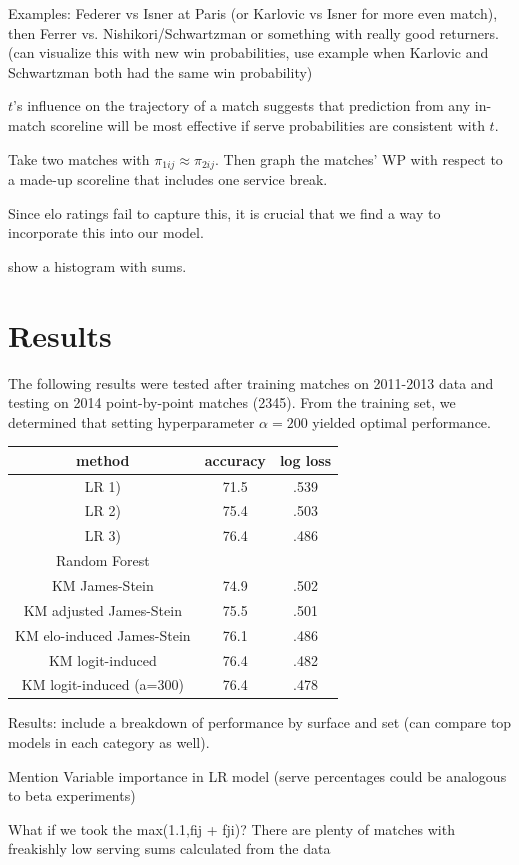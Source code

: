 \documentclass[chapterprefix=false]{report}
\begin{document}
Examples: Federer vs Isner at Paris (or Karlovic vs Isner for more even match), then Ferrer vs. Nishikori/Schwartzman or something with really good returners. (can visualize this with new win probabilities, use example when Karlovic and Schwartzman both had the same win probability)


$t$'s influence on the trajectory of a match suggests that prediction from any in-match scoreline will be most effective if serve probabilities are consistent with $t$.

Take two matches with $\pi_{1ij} \approx \pi_{2ij}$. Then graph the matches' WP with respect to a made-up scoreline that includes one service break.

Since elo ratings fail to capture this, it is crucial that we find a way to incorporate this into our model.

show a histogram with sums.

\section{Results}

The following results were tested after training matches on 2011-2013 data and testing on 2014 point-by-point matches (2345). From the training set, we determined that setting hyperparameter $\alpha=200$ yielded optimal performance.

\begin{center}
\begin{tabular}{ |c|c|c| } 
 \hline
 method & accuracy & log loss
   \\ 
 \hline
  LR 1) & 71.5 & .539
  \\ 
 \hline
  LR 2) & 75.4 & .503
  \\ 
 \hline
 LR 3) & 76.4 & .486
  \\ 
 \hline
 Random Forest &  & 
  \\ 
 \hline
 KM James-Stein & 74.9 & .502
  \\ 
 \hline
 KM adjusted James-Stein & 75.5 & .501
  \\ 
 \hline
 KM elo-induced James-Stein & 76.1 & .486
  \\ 
 \hline
  KM logit-induced & 76.4 & .482
  \\ 
 \hline
 KM logit-induced (a=300) & 76.4 & .478
  \\ 
 \hline
\end{tabular}
\end{center}






Results: include a breakdown of performance by surface and set (can compare top models in each category as well).

Mention Variable importance in LR model (serve percentages could be analogous to beta experiments)

What if we took the max(1.1,fij + fji)? There are plenty of matches with freakishly low serving sums calculated from the data








\end{document}
